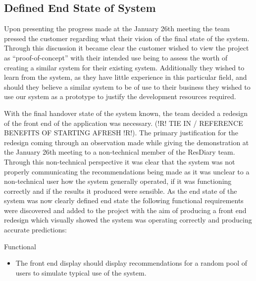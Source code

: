 \documentclass{l3proj}
\begin{document}

\subsection{Defined End State of System}
\label{sec:jandefinedstate}

Upon presenting the progress made at the January 26th meeting the team pressed the customer regarding what their vision of the final state of the system. Through this discussion it became clear the customer wished to view the project as “proof-of-concept” with their intended use being to assess the worth of creating a similar system for their existing system. Additionally they wished to learn from the system, as they have little experience in this particular field, and should they believe a similar system to be of use to their business they wished to use our system as a prototype to justify the development resources required. 

With the final handover state of the system known, the team decided a redesign of the front end of the application was necessary. (!R! TIE IN / REFERENCE BENEFITS OF STARTING AFRESH !R!). The primary justification for the redesign coming through an observation made while giving the demonstration at the January 26th meeting to a non-technical member of the ResDiary team. Through this non-technical perspective it was clear that the system was not properly communicating the recommendations being made as it was unclear to a non-technical user how the system generally operated, if it was functioning correctly and if the results it produced were sensible. As the end state of the system was now clearly defined end state the following functional requirements were discovered and added to the project with the aim of producing a front end redesign which visually showed the system was operating correctly and producing accurate predictions:

Functional
\begin{itemize}
\item The front end display should display recommendations for a random pool of users to simulate typical use of the system.
\end{itemize}
\end{document}
